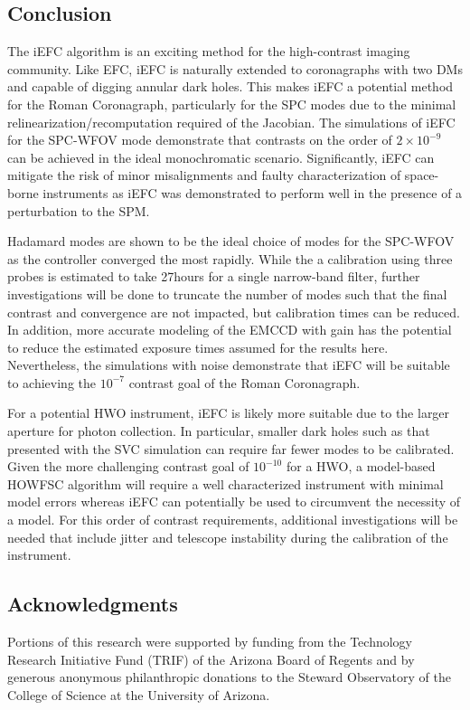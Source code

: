 \documentclass[12pt]{spieman}  %
\begin{document}
\begin{spacing}{2}
\section{Conclusion}
\label{sec:conclusion}
The iEFC algorithm is an exciting method for the high-contrast imaging community. Like EFC, iEFC is naturally extended to coronagraphs with two DMs and capable of digging annular dark holes. This makes iEFC a potential method for the Roman Coronagraph, particularly for the SPC modes due to the minimal relinearization/recomputation required of the Jacobian. The simulations of iEFC for the SPC-WFOV mode demonstrate that contrasts on the order of $2\times10^{-9}$ can be achieved in the ideal monochromatic scenario. Significantly, iEFC can mitigate the risk of minor misalignments and faulty characterization of space-borne instruments as iEFC was demonstrated to perform well in the presence of a perturbation to the SPM. 

Hadamard modes are shown to be the ideal choice of modes for the SPC-WFOV as the controller converged the most rapidly. While the a calibration using three probes is estimated to take 27hours for a single narrow-band filter, further investigations will be done to truncate the number of modes such that the final contrast and convergence are not impacted, but calibration times can be reduced. In addition, more accurate modeling of the EMCCD with gain has the potential to reduce the estimated exposure times assumed for the results here. Nevertheless, the simulations with noise demonstrate that iEFC will be suitable to achieving the $10^{-7}$ contrast goal of the Roman Coronagraph. 

For a potential HWO instrument, iEFC is likely more suitable due to the larger aperture for photon collection. In particular, smaller dark holes such as that presented with the SVC simulation can require far fewer modes to be calibrated. Given the more challenging contrast goal of $10^{-10}$ for a HWO, a model-based HOWFSC algorithm will require a well characterized instrument with minimal model errors whereas iEFC can potentially be used to circumvent the necessity of a model. For this order of contrast requirements, additional investigations will be needed that include jitter and telescope instability during the calibration of the instrument. 

\subsection*{Acknowledgments}
Portions of this research were supported by funding from the Technology Research Initiative Fund (TRIF) of the Arizona Board of Regents and by generous anonymous philanthropic donations to the Steward Observatory of the College of Science at the University of Arizona. 


\end{spacing}
\end{document}
